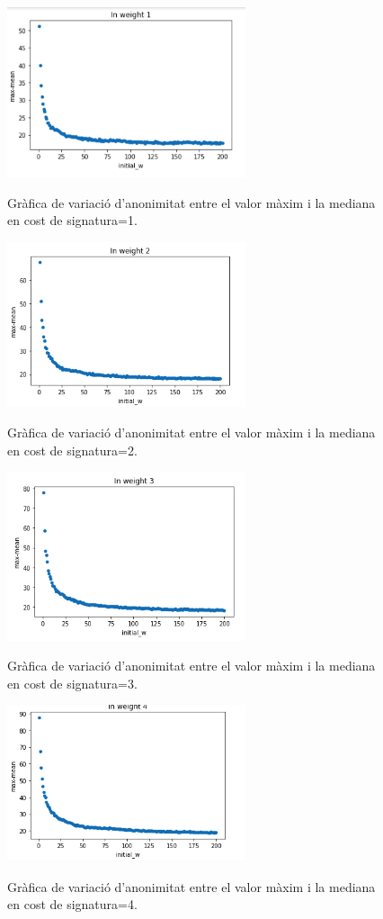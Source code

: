 \documentclass{article}
\begin{document}
\begin{figure}[H]
	\centering
	\includegraphics[width=7cm]{imgs/weight1.png}
	\label{fig:weight1}
	\caption{Gràfica de variació d'anonimitat entre el valor màxim i la mediana en cost de signatura=1.}
\end{figure}
\begin{figure}[H]
	\centering
	\includegraphics[width=7cm]{imgs/weight2.png}
	\label{fig:weight2}
	\caption{Gràfica de variació d'anonimitat entre el valor màxim i la mediana en cost de signatura=2.}
\end{figure}
\begin{figure}[H]
	\centering
	\includegraphics[width=7cm]{imgs/weight3.png}
	\label{fig:weight3}
	\caption{Gràfica de variació d'anonimitat entre el valor màxim i la mediana en cost de signatura=3.}
\end{figure}
\begin{figure}[H]
	\centering
	\includegraphics[width=7cm]{imgs/weight4.png}
	\label{fig:weight4}
	\caption{Gràfica de variació d'anonimitat entre el valor màxim i la mediana en cost de signatura=4.}
\end{figure}
\end{document}
